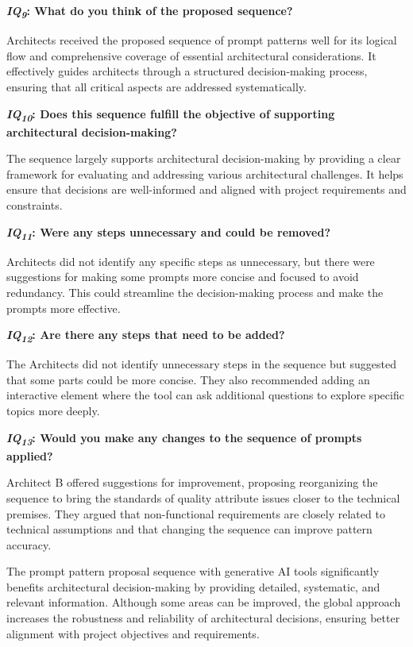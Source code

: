 
\textbf{\textit{IQ\textsubscript{9}}:  What do you think of the proposed sequence?}

Architects received the proposed sequence of prompt patterns well for its logical flow and comprehensive coverage of essential architectural considerations. It effectively guides architects through a structured decision-making process, ensuring that all critical aspects are addressed systematically.

\textbf{\textit{IQ\textsubscript{10}}: Does this sequence fulfill the objective of supporting architectural decision-making?}

The sequence largely supports architectural decision-making by providing a clear framework for evaluating and addressing various architectural challenges. It helps ensure that decisions are well-informed and aligned with project requirements and constraints.

\textbf{\textit{IQ\textsubscript{11}}: Were any steps unnecessary and could be removed?}

Architects did not identify any specific steps as unnecessary, but there were suggestions for making some prompts more concise and focused to avoid redundancy. This could streamline the decision-making process and make the prompts more effective.

\textbf{\textit{IQ\textsubscript{12}}: Are there any steps that need to be added?}

The Architects did not identify unnecessary steps in the sequence but suggested that some parts could be more concise. They also recommended adding an interactive element where the tool can ask additional questions to explore specific topics more deeply.
 
\textbf{\textit{IQ\textsubscript{13}}: Would you make any changes to the sequence of prompts applied?}

Architect B offered suggestions for improvement, proposing reorganizing the sequence to bring the standards of quality attribute issues closer to the technical premises. They argued that non-functional requirements are closely related to technical assumptions and that changing the sequence can improve pattern accuracy.

The prompt pattern proposal sequence with generative AI tools significantly benefits architectural decision-making by providing detailed, systematic, and relevant information. Although some areas can be improved, the global approach increases the robustness and reliability of architectural decisions, ensuring better alignment with project objectives and requirements.

